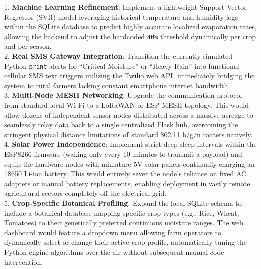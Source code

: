 \documentclass[conference]{IEEEtran}
\begin{document}
1. \textbf{Machine Learning Refinement}: Implement a lightweight Support Vector Regressor (SVR) model leveraging historical temperature and humidity logs within the SQLite database to predict highly accurate localized evaporation rates, allowing the backend to adjust the hardcoded \texttt{40\%} threshold dynamically per crop and per season. \\
2. \textbf{Real SMS Gateway Integration}: Transition the currently simulated Python \texttt{print} alerts for ``Critical Moisture'' or ``Heavy Rain'' into functional cellular SMS text triggers utilizing the Twilio web API, immediately bridging the system to rural farmers lacking constant smartphone internet bandwidth. \\
3. \textbf{Multi-Node MESH Networking}: Upgrade the communication protocol from standard local Wi-Fi to a LoRaWAN or ESP-MESH topology. This would allow dozens of independent sensor nodes distributed across a massive acreage to seamlessly relay data back to a single centralized Flask hub, overcoming the stringent physical distance limitations of standard 802.11 b/g/n routers natively. \\
4. \textbf{Solar Power Independence}: Implement strict deep-sleep intervals within the ESP8266 firmware (waking only every 10 minutes to transmit a payload) and equip the hardware nodes with miniature 5V solar panels continually charging an 18650 Li-ion battery. This would entirely sever the node's reliance on fixed AC adapters or manual battery replacements, enabling deployment in vastly remote agricultural sectors completely off the electrical grid. \\
5. \textbf{Crop-Specific Botanical Profiling}: Expand the local SQLite schema to include a botanical database mapping specific crop types (e.g., Rice, Wheat, Tomatoes) to their genetically preferred continuous moisture ranges. The web dashboard would feature a dropdown menu allowing farm operators to dynamically select or change their active crop profile, automatically tuning the Python engine algorithms over the air without subsequent manual code intervention.
\end{document}

